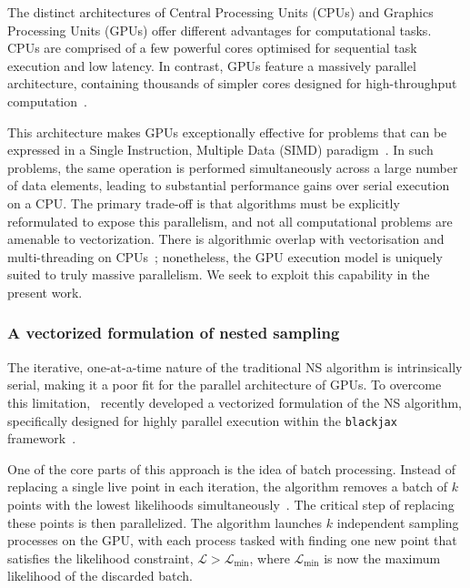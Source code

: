 \documentclass[fleqn,usenatbib]{mnras}
\begin{document}
The distinct architectures of Central Processing Units (CPUs) and
Graphics Processing Units (GPUs) offer different advantages for
computational tasks. CPUs are comprised of a few powerful cores
optimised for sequential task execution and low latency. In contrast,
GPUs feature a massively parallel architecture, containing thousands of
simpler cores designed for high-throughput computation~\citep{GPU_computing}.

This architecture makes GPUs exceptionally effective for problems that can
be expressed in a Single Instruction, Multiple Data (SIMD) paradigm~\citep{CUDAGuide}.
In such problems, the same operation is performed simultaneously across
a large number of data elements, leading to substantial performance
gains over serial execution on a CPU. The primary trade-off is that
algorithms must be explicitly reformulated to expose this parallelism,
and not all computational problems are amenable to vectorization.
There is algorithmic overlap with vectorisation and multi-threading on CPUs~\citep{Handley:2015vkr, Smith:2019ucc}; 
nonetheless, the GPU execution model is uniquely suited to truly massive parallelism. We seek to exploit this 
capability in the present work.

\subsubsection{A vectorized formulation of nested sampling}
\label{sec:background_vectorized_ns}

The iterative, one-at-a-time nature of the traditional NS algorithm
is intrinsically serial, making it a poor fit for the parallel
architecture of GPUs. To overcome this limitation,~\cite{yallup2025nested}
recently developed a vectorized formulation of the NS algorithm,
specifically designed for highly parallel execution within the
\texttt{blackjax} framework~\citep{cabezas2024blackjax}.

One of the core parts of this approach is the idea of batch
processing. Instead of replacing a single live point in each iteration,
the algorithm removes a batch of $k$ points with the lowest likelihoods
simultaneously~\citep{parallel_ns}. The critical step of replacing these points is then
parallelized. The algorithm launches $k$ independent sampling processes
on the GPU, with each process tasked with finding one new point that
satisfies the likelihood constraint, $\mathcal{L} > \mathcal{L}_{\text{min}}$,
where $\mathcal{L}_{\text{min}}$ is now the maximum likelihood of the
discarded batch.
\end{document}
